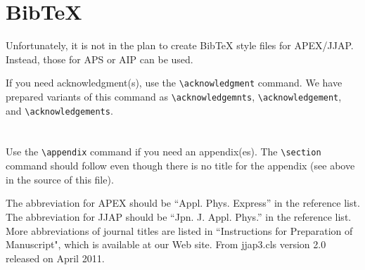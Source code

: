 \documentclass{jbook}
\begin{document}
\section{BibTeX}

Unfortunately, it is not in the plan to create BibTeX style files for APEX/JJAP. Instead, those for APS or AIP can be used.

\acknowledgment
If you need acknowledgment(s), use the \verb|\acknowledgment| command. We have prepared variants of this command as \verb|\acknowledgemnts|, \verb|\acknowledgement|, and \verb|\acknowledgements|.

\appendix
\section{}

Use the \verb|\appendix| command if you need an appendix(es). The \verb|\section| command should follow even though there is no title for the appendix (see above in the source of this file).

\begin{thebibliography}{9}
 The abbreviation for APEX should be ``Appl. Phys. Express'' in the reference list.
 The abbreviation for JJAP should be ``Jpn. J. Appl. Phys.'' in the reference list.
 More abbreviations of journal titles are listed in ``Instructions for Preparation of Manuscript", which is available at our Web site.
 From jjap3.cls version 2.0 released on April 2011.
\end{thebibliography}
\end{document}
